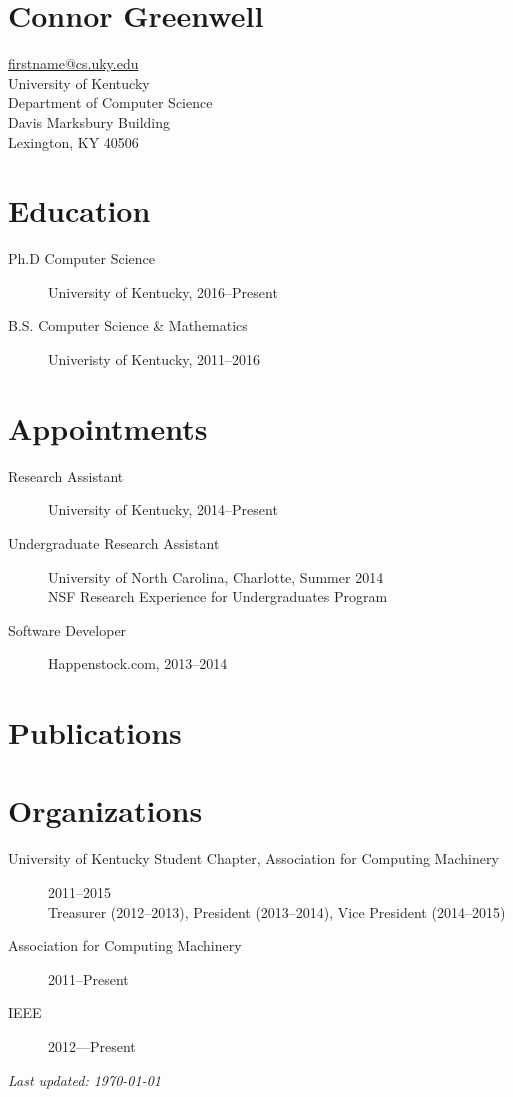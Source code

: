 \documentclass[12pt]{article}
\begin{document}
\section*{\bf\huge Connor Greenwell}
\href{mailto:firstname@cs.uky.edu}{firstname@cs.uky.edu} \\
University of Kentucky\\
Department of Computer Science\\
Davis Marksbury Building\\
Lexington, KY 40506

\section*{Education}

\begin{description}
    \item[Ph.D Computer Science]
        University of Kentucky, 2016--Present
    \item[B.S. Computer Science \& Mathematics]
        Univeristy of Kentucky, 2011--2016
\end{description}

\section*{Appointments}

\begin{description}
    \item[Research Assistant]
        University of Kentucky, 2014--Present
    \item[Undergraduate Research Assistant]
        University of North Carolina, Charlotte, Summer 2014\\
        NSF Research Experience for Undergraduates Program
    \item[Software Developer]
        Happenstock.com, 2013--2014
\end{description}

\section*{Publications}

\nocite{*}
\printbibliography[heading=none]

\section*{Organizations}

\begin{description}
    \item[University of Kentucky Student Chapter, 
        Association for Computing Machinery] 
        2011--2015\\
        Treasurer (2012--2013), President (2013--2014), Vice President
        (2014--2015)
    \item[Association for Computing Machinery] 2011--Present
    \item[IEEE] 2012---Present
\end{description}

\vspace{\fill}
{\centering
    \small\emph{Last updated: \today}\par
}
\end{document}
